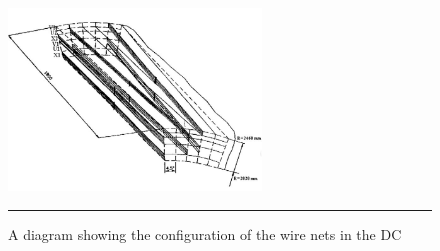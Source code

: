 \begin{figure}[htbp]
  \centering
    \includegraphics[width=0.6\textwidth]{Figures/dcdiagram.jpg}
    \rule{35em}{0.5pt}
  \caption[Wire net configuration in the DC]{A diagram showing the configuration of the wire nets in the DC}
  \label{fig:dcdiagram}
\end{figure}

